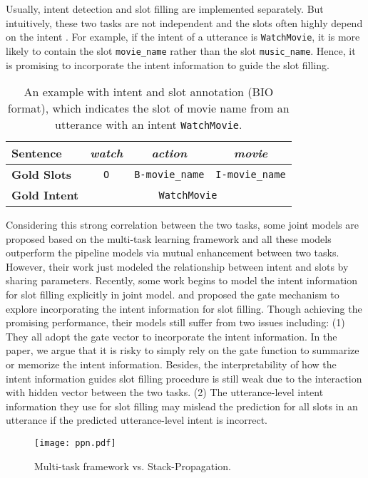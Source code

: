 \documentclass[11pt,a4paper]{article}
\begin{document}
Usually, intent detection and slot filling are implemented separately. But intuitively, 
these two tasks are not independent and the slots often highly depend on the
intent \cite{goo2018slot}. For example, if the intent of a utterance is
\texttt{WatchMovie}, it is more likely to contain the slot \texttt{movie\_name} rather
than the slot \texttt{music\_name}. 
Hence, it is promising to incorporate the intent information to guide the slot filling.
\begin{table}[t]
	\centering
	\begin{adjustbox}{width=0.48\textwidth}
		\tiny
		
		\begin{tabular}{|l|c|c|c|}
			\hline
			\textbf{Sentence} & \textit{watch} & \textit{action} & \textit{movie} \\
			\hline
			\textbf{Gold Slots} & \texttt{O} & \texttt{B-movie\_name} & \texttt{I-movie\_name}  \\
			\hline      
			\textbf{Gold Intent} & \multicolumn{3}{c|}{\texttt{WatchMovie}}\\
			\hline    
		\end{tabular}
		
	\end{adjustbox}
	
	\caption{An example  with intent and slot annotation (BIO format), which indicates the slot of movie name from an utterance with an intent \texttt{WatchMovie}.}
	\label{example1}
\end{table}

Considering this strong correlation between
the two tasks, some joint models are proposed based on the multi-task learning framework \cite{zhang2016joint,hakkani2016multi,liu2016attention} and all these models outperform the pipeline models via mutual enhancement between two tasks. However, their work just modeled the relationship between intent and slots by sharing parameters.
Recently, some work begins to model the intent information for slot filling explicitly in joint model.
\citet{goo2018slot} and \citet{li2018self} proposed the gate mechanism to explore incorporating the intent information for slot filling.
Though achieving the promising performance, their models still suffer from two issues including: (1) They all adopt the gate vector to incorporate the intent information. 
In the paper, we argue that it is risky to simply rely on the gate function
to summarize or memorize the intent information.
Besides,  the interpretability of how the intent information guides slot filling procedure is still weak due to the interaction with hidden vector between the two tasks. 
(2) The utterance-level intent information they use for slot filling may mislead the prediction for all slots in an utterance if the predicted utterance-level intent is incorrect.
\begin{figure}[t!]
	\centering
	\texttt{[image: ppn.pdf]}
	\caption{Multi-task framework vs. Stack-Propagation.}\label{fig:stack}
\end{figure}
\end{document}
